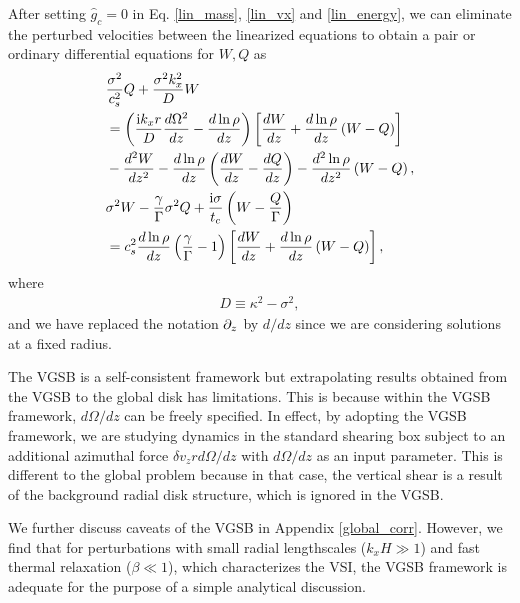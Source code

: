 After setting $\hat{g}_c=0$ in Eq. \ref{lin_mass}, \ref{lin_vx} and
\ref{lin_energy}, we can eliminate the perturbed velocities between
the linearized equations to obtain a pair or ordinary differential
equations for $W,Q$ as
\begin{align}
  &\frac{\sigma^2}{c_s^2}Q + \frac{\sigma^2k_x^2}{D}W \notag\\ 
  &=\left(\frac{\mathrm{i}
      k_x r}{D}\frac{d\Omega^2}{dz} -
    \frac{d\ln{\rho}}{dz}\right)\left[\frac{dW}{dz} +
    \frac{d\ln{\rho}}{dz}\left(W-Q\right)\right] \notag\\
  &- \frac{d^2W}{dz^2} - \frac{d\ln{\rho}}{dz}\left(\frac{dW}{dz} -
    \frac{dQ}{dz}\right) - \frac{d^2\ln{\rho}}{dz^2}\left(W-Q\right),\label{ode_w}\\
  &\sigma^2W - \frac{\gamma}{\Gamma}\sigma^2 Q +
  \frac{\mathrm{i}\sigma}{t_c}\left(W-\frac{Q}{\Gamma}\right)\notag\\
  &=c_s^2\frac{d\ln{\rho}}{dz}\left(\frac{\gamma}{\Gamma} - 1\right) 
  \left[\frac{dW}{dz} + \frac{d\ln{\rho}}{dz}\left(W-Q\right)\right],\label{ode_Q} 
\end{align}
where
\begin{align}
  D \equiv \kappa^2 - \sigma^2,
\end{align}
and we have replaced the notation $\partial_z$ by $d/dz$ since we are
considering solutions at a fixed radius. 

The VGSB is a self-consistent framework but extrapolating results 
obtained from the VGSB to the global disk has limitations. This is
because within the VGSB framework, $d\Omega/dz$ can be freely
specified. In effect, by adopting the VGSB framework, we are studying
dynamics in the standard shearing box subject to an additional
azimuthal force $\delta v_zr d \Omega/dz$ with $d\Omega/dz$ as an
input parameter. This is different to the global problem because in
that case, the vertical shear is a result of the background radial
disk structure, which is ignored in the VGSB.    

We further discuss caveats of the VGSB in Appendix \ref{global_corr}.
However, we find that for perturbations with small radial lengthscales
($k_xH\gg 1$) and fast thermal relaxation ($\beta\ll1$), which
characterizes the VSI, the VGSB framework is adequate for the purpose
of a simple analytical discussion. 




